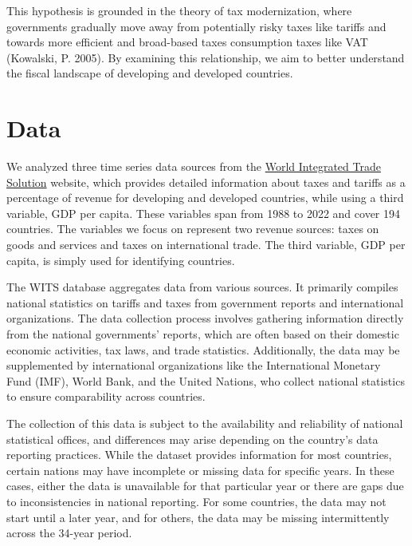 \documentclass[12pt]{article}
\begin{document}
This hypothesis is grounded in the theory of tax modernization, where governments gradually move away from potentially risky taxes like tariffs and towards more efficient and broad-based taxes consumption taxes like VAT (Kowalski, P. 2005). By examining this relationship, we aim to better understand the fiscal landscape of developing and developed countries.

\section{Data}
\label{sec:data}

We analyzed three time series data sources from the \href{https://wits.worldbank.org/CountryProfile/en/Country/BY-COUNTRY/StartYear/1988/EndYear/2022/Indicator/GC-TAX-GSRV-VA-ZS}{World Integrated Trade Solution} website, which provides detailed information about taxes and tariffs as a percentage of revenue for developing and developed countries, while using a third variable, GDP per capita. These variables span from 1988 to 2022 and cover 194 countries. The variables we focus on represent two revenue sources: taxes on goods and services and taxes on international trade. The third variable, GDP per capita, is simply used for identifying countries.

The WITS database aggregates data from various sources. It primarily compiles national statistics on tariffs and taxes from government reports and international organizations. The data collection process involves gathering information directly from the national governments' reports, which are often based on their domestic economic activities, tax laws, and trade statistics. Additionally, the data may be supplemented by international organizations like the International Monetary Fund (IMF), World Bank, and the United Nations, who collect national statistics to ensure comparability across countries.

The collection of this data is subject to the availability and reliability of national statistical offices, and differences may arise depending on the country’s data reporting practices. While the dataset provides information for most countries, certain nations may have incomplete or missing data for specific years. In these cases, either the data is unavailable for that particular year or there are gaps due to inconsistencies in national reporting. For some countries, the data may not start until a later year, and for others, the data may be missing intermittently across the 34-year period.
\end{document}
